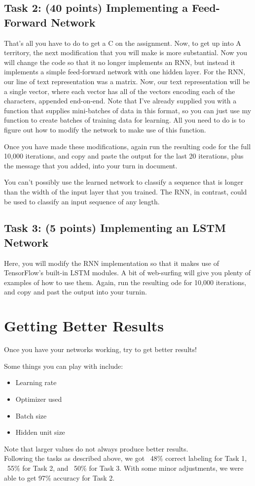 \documentclass[11pt]{article}
\renewcommand\:{\colon} %
\begin{document}
\subsection{Task 2: (40 points) Implementing a Feed-Forward Network} 
That's all you have to do to get a C on the assignment. Now, to get up into A territory, the next modification
that you will make is more substantial. Now you will change the code so that it no longer implements
an RNN, but instead it implements a simple feed-forward network with one hidden layer. For the RNN, our
line of text representation was a matrix. Now, our text representation will be a single vector, where each vector has all of the vectors
encoding each of the characters, appended end-on-end. Note that I've already supplied you with a function
that supplies mini-batches of data in this format, so you can just use my function to create batches of training
data for learning. All you need to do is to figure out how to modify the network to make use of this function.

Once you have made these modifications, again run the resulting code for the full 10,000 iterations, and
copy and paste the output for the last 20 iterations, plus the message that you added, into your turn in document.


You can't possibly use the learned network to classify a sequence
that is longer than the width of the input layer that you trained. The RNN, in contrast, could be used to
classify an input sequence of any length.

\subsection{Task 3: (5 points) Implementing an LSTM Network}
Here, you will modify the RNN implementation so that it makes use of TensorFlow's built-in
LSTM modules. A bit of web-surfing will give you plenty of examples of how to use them. Again, run
the resulting ode for 10,000 iterations, and copy and past the output into your turnin.

\section{Getting Better Results}
Once you have your networks working, try to get better results!

Some things you can play with include:
\begin{itemize}
\item Learning rate %
\item Optimizer used
\item Batch size
\item Hidden unit size %
\end{itemize}

Note that larger values do not always produce better results.\\

Following the tasks as described above, we got ~48\% correct labeling for Task 1, ~55\% for Task 2, and ~50\% for Task 3. With some minor adjustments, we were able to get 97\% accuracy for Task 2. 
\end{document}
